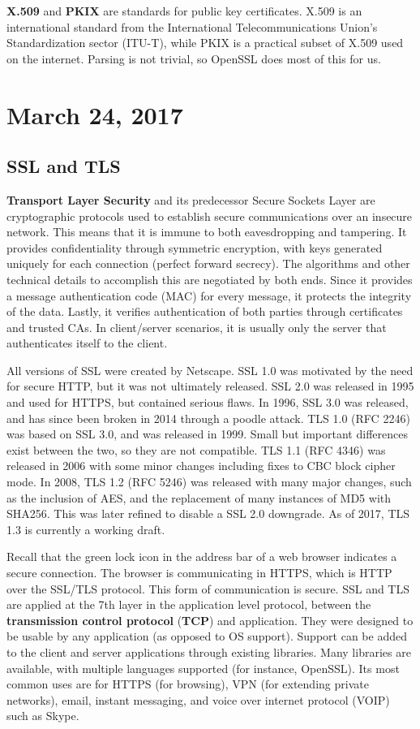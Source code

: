 \documentclass[11pt]{article}
\theoremstyle{plain} %
\theoremstyle{definition}
\theoremstyle{example}
\theoremstyle{remark}
\begin{document}
\textbf{X.509} and \textbf{PKIX} are standards for public key certificates. X.509 is an international standard from the International Telecommunications Union's Standardization sector (ITU-T), while PKIX is a practical subset of X.509 used on the internet. Parsing is not trivial, so OpenSSL does most of this for us. 

\section{March 24, 2017}
\subsection{SSL and TLS}

\textbf{Transport Layer Security} and its predecessor {Secure Sockets Layer} are cryptographic protocols used to establish secure communications over an insecure network. This means that it is immune to both eavesdropping and tampering. It provides confidentiality through symmetric encryption, with keys generated uniquely for each connection (perfect forward secrecy). The algorithms and other technical details to accomplish this are negotiated by both ends. Since it provides a message authentication code (MAC) for every message, it protects the integrity of the data. Lastly, it verifies authentication of both parties through certificates and trusted CAs. In client/server scenarios, it is usually only the server that authenticates itself to the client. 

All versions of SSL were created by Netscape. SSL 1.0 was motivated by the need for secure HTTP, but it was not ultimately released. SSL 2.0 was released in 1995 and used for HTTPS, but contained serious flaws. In 1996, SSL 3.0 was released, and has since been broken in 2014 through a poodle attack. TLS 1.0 (RFC 2246) was based on SSL 3.0, and was released in 1999. Small but important differences exist between the two, so they are not compatible. TLS 1.1 (RFC 4346) was released in 2006 with some minor changes including fixes to CBC block cipher mode. In 2008, TLS 1.2 (RFC 5246) was released with many major changes, such as the inclusion of AES, and the replacement of many instances of MD5 with SHA256. This was later refined to disable a SSL 2.0 downgrade. As of 2017, TLS 1.3 is currently a working draft. 

Recall that the green lock icon in the address bar of a web browser indicates a secure connection. The browser is communicating in HTTPS, which is HTTP over the SSL/TLS protocol. This form of communication is secure. SSL and TLS are applied at the 7th layer in the application level protocol, between the \textbf{transmission control protocol} (\textbf{TCP}) and application. They were designed to be usable by any application (as opposed to OS support). Support can be added to the client and server applications through existing libraries. Many libraries are available, with multiple languages supported (for instance, OpenSSL). Its most common uses are for HTTPS (for browsing), VPN (for extending private networks), email, instant messaging, and voice over internet protocol (VOIP) such as Skype. 
\end{document}
